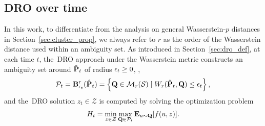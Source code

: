 \subsection{\Gls{DRO} over time}
\label{sec:over_time}
In this work, to differentiate from the analysis on general Wasserstein-$p$ distances in Section~\ref{sec:cluster_prop}, we always refer to $r$ as the order of the Wasserstein distance used within an ambiguity set.
As introduced in Section~\ref{sec:dro_def}, at each time $t$, the~\gls{DRO} approach under the Wasserstein metric constructs an ambiguity set  around $\hat{{\mathbf P}}_t$ of radius $\epsilon_t \geq 0$, \ie,
\begin{equation}\label{empirical:ball}
\mathcal{P}_t = \mathbf{B}_{\epsilon_t}^r(\hat{{\mathbf P}}_t)=\left\{\mathbf{Q} \in \mathcal{M}_{r}({\mathcal{S}}) \mid W_r(\hat{{\mathbf P}}_t, \mathbf{Q}) \leq \epsilon_t\right\},
\end{equation}
and the~\gls{DRO} solution $z_t \in \mathcal{Z}$ is computed by solving the optimization problem
\begin{equation}\label{eq:DRO}
H_t = \min_{z \in \mathcal{Z}} \max_{\mathbf{Q} \in \mathcal{P}_{t}}\mathbf{E}_{u \sim \mathbf{Q}}[f(u,z)].
\end{equation}
\label{subsec:nom_perf}
